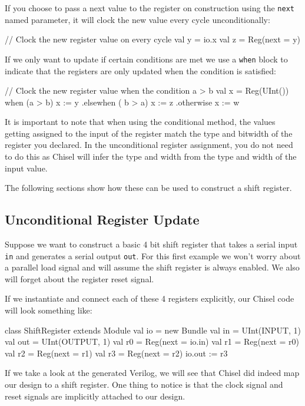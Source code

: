 If you choose to pass a next value to the register on construction using the \verb+next+ named parameter, it will clock the new value every cycle unconditionally:

\begin{scala}
// Clock the new register value on every cycle
val y = io.x
val z = Reg(next = y)
\end{scala}

If we only want to update if certain conditions are met we use a \verb+when+ block to indicate that the registers are only updated when the condition is satisfied:

\begin{scala}
// Clock the new register value when the condition a > b
val x = Reg(UInt())
when (a > b) { x := y }
.elsewhen ( b > a) {x := z}
.otherwise { x := w}
\end{scala}

It is important to note that when using the conditional method, the values getting assigned to the input of the register match the type and bitwidth of the register you declared. In the unconditional register assignment, you do not need to do this as Chisel will infer the type and width from the type and width of the input value.

The following sections show how these can be used to construct a shift register.

\subsection{Unconditional Register Update}

Suppose we want to construct a basic 4 bit shift register that takes a serial input \verb+in+ and generates a serial output \verb+out+. For this first example we won't worry about a parallel load signal and will assume the shift register is always enabled. We also will forget about the register reset signal.

If we instantiate and connect each of these 4 registers explicitly, our Chisel code will look something like:

\begin{scala}
class ShiftRegister extends Module {
  val io = new Bundle {
    val in  = UInt(INPUT, 1)
    val out = UInt(OUTPUT, 1)
  }
  val r0 = Reg(next = io.in)
  val r1 = Reg(next = r0)
  val r2 = Reg(next = r1)
  val r3 = Reg(next = r2)
  io.out := r3
}
\end{scala}

If we take a look at the generated Verilog, we will see that Chisel did indeed map our design to a shift register. One thing to notice is that the clock signal and reset signals are implicitly attached to our design.


